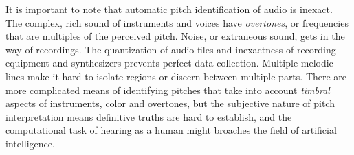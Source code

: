 It is important to note that automatic pitch identification of audio is inexact. The complex, rich sound of instruments and voices have \textit{overtones}, or frequencies that are multiples of the perceived pitch. Noise, or extraneous sound, gets in the way of recordings. The quantization of audio files and inexactness of recording equipment and synthesizers prevents perfect data collection. Multiple melodic lines make it hard to isolate regions or discern between multiple parts. There are more complicated means of identifying pitches that take into account \textit{timbral} aspects of instruments, color and overtones, but the subjective nature of pitch interpretation means definitive truths are hard to establish, and the computational task of hearing as a human might broaches the field of artificial intelligence.